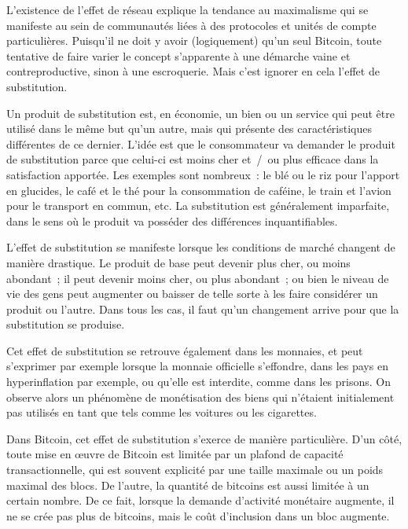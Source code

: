 L'existence de l'effet de réseau explique la tendance au maximalisme qui se manifeste au sein de communautés liées à des protocoles et unités de compte particulières. Puisqu'il ne doit y avoir (logiquement) qu'un seul Bitcoin, toute tentative de faire varier le concept s'apparente à une démarche vaine et contreproductive, sinon à une escroquerie. Mais c'est ignorer en cela l'effet de substitution.


Un produit de substitution est, en économie, un bien ou un service qui peut être utilisé dans le même but qu'un autre, mais qui présente des caractéristiques différentes de ce dernier. L'idée est que le consommateur va demander le produit de substitution parce que celui-ci est moins cher et~/~ou plus efficace dans la satisfaction apportée. Les exemples sont nombreux~: le blé ou le riz pour l'apport en glucides, le café et le thé pour la consommation de caféine, le train et l'avion pour le transport en commun, etc. La substitution est généralement imparfaite, dans le sens où le produit va posséder des différences inquantifiables.

L'effet de substitution se manifeste lorsque les conditions de marché changent de manière drastique. Le produit de base peut devenir plus cher, ou moins abondant~; il peut devenir moins cher, ou plus abondant~; ou bien le niveau de vie des gens peut augmenter ou baisser de telle sorte à les faire considérer un produit ou l'autre. Dans tous les cas, il faut qu'un changement arrive pour que la substitution se produise.

Cet effet de substitution se retrouve également dans les monnaies, et peut s'exprimer par exemple lorsque la monnaie officielle s'effondre, dans les pays en hyperinflation par exemple, ou qu'elle est interdite, comme dans les prisons. On observe alors un phénomène de monétisation des biens qui n'étaient initialement pas utilisés en tant que tels comme les voitures ou les cigarettes.

Dans Bitcoin, cet effet de substitution s'exerce de manière particulière. D'un côté, toute mise en œuvre de Bitcoin est limitée par un plafond de capacité transactionnelle, qui est souvent explicité par une taille maximale ou un poids maximal des blocs. De l'autre, la quantité de bitcoins est aussi limitée à un certain nombre. De ce fait, lorsque la demande d'activité monétaire augmente, il ne se crée pas plus de bitcoins, mais le coût d'inclusion dans un bloc augmente.

